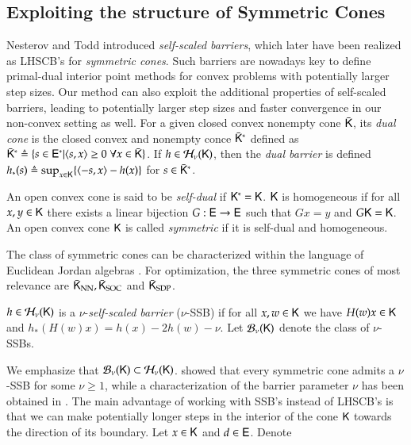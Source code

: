 \subsection{Exploiting the structure of Symmetric Cones}
Nesterov and Todd \cite{NesTod97} introduced \emph{self-scaled barriers}, which later have been realized as LHSCB's for \emph{symmetric cones}. Such barriers are nowadays key to define primal-dual interior point methods for convex problems with potentially larger step sizes. Our method can also exploit the additional properties of self-scaled barriers, leading to potentially larger step sizes and faster convergence in our non-convex setting as well. For a given closed convex nonempty cone $\bar{\mathsf{K}}$, its \emph{dual cone} is the closed convex and nonempty conce $\bar{\mathsf{K}}^{\ast}$ defined as $\bar{\mathsf{K}}^{\ast}\triangleq\{s\in\mathsf{E}^{\ast}\vert\langle s,x\rangle\geq 0\;\forall x\in\bar{\mathsf{K}}\}$. If $h\in\mathcal{H}_{\nu}(\mathsf{K})$, then the \emph{dual barrier} is defined $h_{\ast}(s)\triangleq\sup_{x\in\mathsf{K}}\{\langle-s,x\rangle-h(x)\}$ for $s\in\bar{\mathsf{K}}^{\ast}$.
\begin{definition}\label{def:SymCone}
An open convex cone is said to be \emph{self-dual} if $\mathsf{K}^{\ast}=\mathsf{K}$. $\mathsf{K}$ is homogeneous if for all $x,y\in\mathsf{K}$ there exists a linear bijection $G:\mathsf{E}\to\mathsf{E}$ such that $Gx=y$ and $G\mathsf{K}=\mathsf{K}$. An open convex cone $\mathsf{K}$ is called \emph{symmetric} if it is self-dual and homogeneous. 
\end{definition}
The class of symmetric cones can be characterized within the language of Euclidean Jordan algebras \cite{FayLu06,Fay08,FarKor94,Schmieta2003}. For optimization, the three symmetric cones of most relevance are $\bar{\mathsf{K}}_{\text{NN}},\bar{\mathsf{K}}_{\text{SOC}}$ and $\bar{\mathsf{K}}_{\text{SDP}}$. %
\begin{definition}
$h\in\mathcal{H}_{\nu}(\mathsf{K})$ is a $\nu$-\emph{self-scaled barrier} ($\nu$-SSB) if for all $x,w\in\mathsf{K}$ we have $H(w)x\in\mathsf{K}$ and $h_{\ast}(H(w)x)=h(x)-2h(w)-\nu$. Let $\mathcal{B}_{\nu}(\mathsf{K})$ denote the class of $\nu$-SSBs.  
\end{definition}
We emphasize that $\mathcal{B}_{\nu}(\mathsf{K})\subset\mathcal{H}_{\nu}(\mathsf{K})$. \cite{HauGul02} showed that every symmetric cone admits a $\nu$-SSB for some $\nu\geq 1$, while a characterization of the barrier parameter $\nu$ has been obtained in \cite{GulTun98}. The main advantage of working with SSB's instead of LHSCB's is that we can make potentially longer steps in the interior of the cone $\mathsf{K}$ towards the direction of its boundary. Let $x \in\mathsf{K}$ and $d \in \mathsf{E}$. Denote
